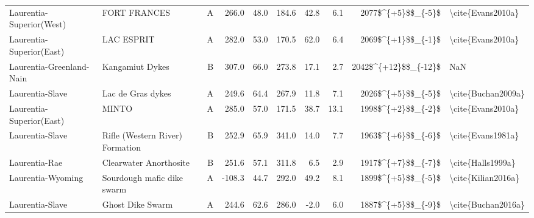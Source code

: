 \begin{longtable}{p{1 in}p{1 in}rrrrrrr}
      Laurentia-Superior(West) &                                       FORT FRANCES &      A &     266.0 &      48.0 & 184.6 &  42.8 &       6.1 &     2077\$\textasciicircum \{+5\}\$\$\_\{-5\}\$ &                                  \textbackslash cite\{Evans2010a\} \\
      Laurentia-Superior(East) &                                         LAC ESPRIT &      A &     282.0 &      53.0 & 170.5 &  62.0 &       6.4 &     2069\$\textasciicircum \{+1\}\$\$\_\{-1\}\$ &                                  \textbackslash cite\{Evans2010a\} \\
      Laurentia-Greenland-Nain &                                    Kangamiut Dykes &      B &     307.0 &      66.0 & 273.8 &  17.1 &       2.7 &   2042\$\textasciicircum \{+12\}\$\$\_\{-12\}\$ &                                                NaN \\
               Laurentia-Slave &                                  Lac de Gras dykes &      A &     249.6 &      64.4 & 267.9 &  11.8 &       7.1 &     2026\$\textasciicircum \{+5\}\$\$\_\{-5\}\$ &                                 \textbackslash cite\{Buchan2009a\} \\
      Laurentia-Superior(East) &                                              MINTO &      A &     285.0 &      57.0 & 171.5 &  38.7 &      13.1 &     1998\$\textasciicircum \{+2\}\$\$\_\{-2\}\$ &                                  \textbackslash cite\{Evans2010a\} \\
               Laurentia-Slave &                    Rifle (Western River) Formation &      B &     252.9 &      65.9 & 341.0 &  14.0 &       7.7 &     1963\$\textasciicircum \{+6\}\$\$\_\{-6\}\$ &                                  \textbackslash cite\{Evans1981a\} \\
                 Laurentia-Rae &                             Clearwater Anorthosite &      B &     251.6 &      57.1 & 311.8 &   6.5 &       2.9 &     1917\$\textasciicircum \{+7\}\$\$\_\{-7\}\$ &                                  \textbackslash cite\{Halls1999a\} \\
             Laurentia-Wyoming &                         Sourdough mafic dike swarm &      A &    -108.3 &      44.7 & 292.0 &  49.2 &       8.1 &     1899\$\textasciicircum \{+5\}\$\$\_\{-5\}\$ &                                 \textbackslash cite\{Kilian2016a\} \\
               Laurentia-Slave &                                   Ghost Dike Swarm &      A &     244.6 &      62.6 & 286.0 &  -2.0 &       6.0 &     1887\$\textasciicircum \{+5\}\$\$\_\{-9\}\$ &                                 \textbackslash cite\{Buchan2016a\} \\

\end{longtable}
